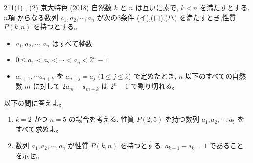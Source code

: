 \begin{prob}{211}{(1) , (2) }{京大特色 (2018)}
 自然数 $k$ と $n$ は互いに素で, $k<n$ を満たすとする. $n$項 からなる数列 $a_1,a_2,\cdots,a_n$ が次の3条件 (イ),(ロ),(ハ) を満たすとき,性質 $P(k,n)$ を持つとする。
 \begin{itemize}
  \item[(イ)] $a_1,a_2,\cdots,a_n$ はすべて整数
  \item[(ロ)] $0\le a_1<a_2<\cdots<a_n<2^n-1$
  \item[(ハ)] $a_{n+1},\cdots a_{n+k}$ を $a_{n+j}=a_j$ ($1\le j\le k$) で定めたとき, $n$ 以下のすべての自然数 $m$ に対して $2a_m-a_{m+k}$ は $2^n-1$ で割り切れる。
 \end{itemize}
 以下の問に答えよ。
 \begin{enumerate}
  \item $k=2$ かつ $n=5$ の場合を考える. 性質 $P(2,5)$ を持つ数列 $a_1,a_2,\cdots,a_5$ をすべて求めよ。
  \item 数列 $a_1,a_2,\cdots,a_n$ が性質 $P(k,n)$ を持つとする. $a_{k+1}-a_k=1$ であることを示せ。
 \end{enumerate}
\end{prob}

